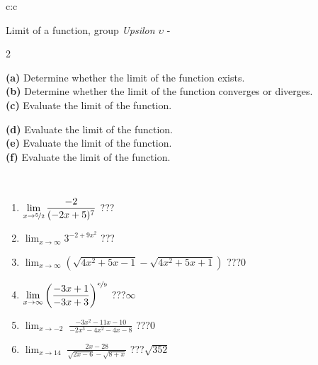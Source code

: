 \documentclass[10pt]{report}
\begin{document}
\newpage
\thispagestyle{empty}
\begin{tabular}{c:c}
\begin{minipage}[c][104.5mm][t]{0.5\linewidth}
\begin{center}
\vspace{5mm}
{\huge Limit of a function, group \textit{Upsilon $\upsilon$} -}\\[5mm]
\begin{minipage}{0.95\linewidth}
\begin{center}
{\small \begin{multicols}{2} \raggedright
\textbf{(a)} Determine whether the limit of the function exists. \\[1mm]
\textbf{(b)} Determine whether the limit of the function converges or diverges. \\[1mm]
\textbf{(c)} Evaluate the limit of the function. \par \columnbreak
\textbf{(d)} Evaluate the limit of the function. \\[1mm]
\textbf{(e)} Evaluate the limit of the function. \\[1mm]
\textbf{(f)} Evaluate the limit of the function. \\[1mm]
\end{multicols}
}
\end{center}
\end{minipage}
\\[1mm]
\begin{minipage}{0.79\linewidth}
\begin{center}
\begin{varwidth}{\linewidth}
\setlength{\itemsep}{0pt}
\begin{enumerate}
\normalsize
\item $\displaystyle\lim_{x\to\nicefrac{5}{2}}{\frac{-2}{(-2x+5)^{7}}}$\quad \dotfill\; ???\;\dotfill \quad {}
\item $\displaystyle\lim_{x\to\infty}{3^{-2+9x^2}}$\quad \dotfill\; ???\;\dotfill \quad {}
\item $\displaystyle\lim_{x\to\infty}{\left(\sqrt{4x^2+5x-1} - \sqrt{4x^2+5x+1}\right)}$\quad \dotfill\; ???\;\dotfill \quad $0$
\item $\displaystyle\lim_{x\to\infty}{\left( \frac{-3x+1}{-3x+3} \right)^{\nicefrac{x}{9}}}$\quad \dotfill\; ???\;\dotfill \quad $\infty$
\item $\displaystyle\lim_{x\to -2}{\;\frac{-3x^2-11x-10}{-2x^3-4x^2-4x-8}}$\quad \dotfill\; ???\;\dotfill \quad $0$
\item $\displaystyle\lim_{x\to 14}{\;\frac{2x-28}{\sqrt{2x-6} - \sqrt{8+x}}}$\quad \dotfill\; ???\;\dotfill \quad $\sqrt{352}$

\end{enumerate}
\end{varwidth}
\end{center}
\end{minipage}
\end{center}
\end{minipage}
\end{tabular}
\end{document}
